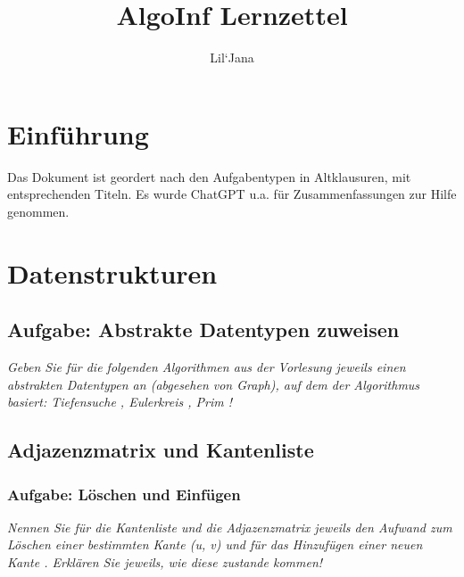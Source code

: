 \documentclass{article}
\title{AlgoInf Lernzettel}
\author{Lil`Jana}
\begin{document}
\maketitle
\tableofcontents
\newpage 
   
\section{Einführung}
Das Dokument ist geordert nach den Aufgabentypen in Altklausuren, mit entsprechenden Titeln. \newline
Es wurde ChatGPT \cite{chatgpt} u.a. für Zusammenfassungen zur Hilfe genommen. 

\newpage
\section{Datenstrukturen}
\subsection{Aufgabe: Abstrakte Datentypen zuweisen}
\textit{Geben Sie für die folgenden Algorithmen aus der Vorlesung jeweils einen abstrakten Datentypen an (abgesehen von Graph), auf dem der Algorithmus basiert: Tiefensuche , Eulerkreis , Prim !} \cite{hauptklausur21}

\newpage
\subsection{Adjazenzmatrix und Kantenliste }
\subsubsection{Aufgabe: Löschen und Einfügen \textcolor{ForestGreen}{\CheckmarkBold}}
\textit{Nennen Sie für die Kantenliste  und die  Adjazenzmatrix  jeweils den Aufwand zum Löschen einer bestimmten Kante (u, v) und für das Hinzufügen einer neuen Kante .
Erklären Sie jeweils, wie diese zustande kommen! } \cite{probeklausur24} \cite{probeklausur21} \newline
\end{document}
